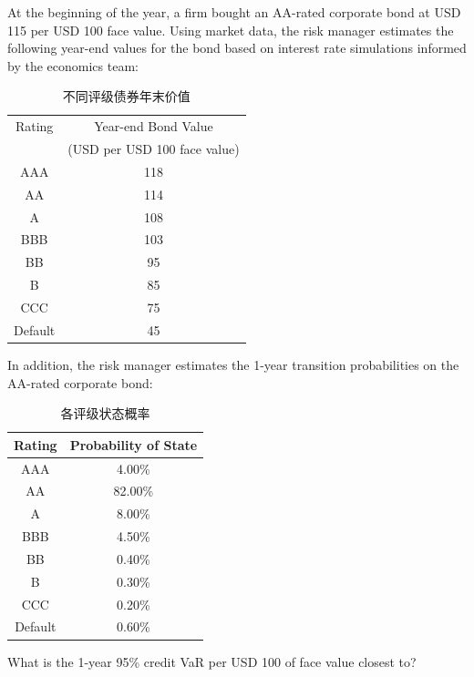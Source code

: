 \documentclass{article}
\newcounter{question} %
\begin{document}
\begin{question}
    At the beginning of the year, a firm bought an AA-rated corporate bond at USD 115 per USD 100 face value. Using market data, the risk manager estimates the following year-end values for the bond based on interest rate simulations informed by the economics team:

    \begin{table}[htbp]
        \centering
        \begin{tabular}{|c|c|}
            \hline
            Rating & Year-end Bond Value \\
            & (USD per USD 100 face value) \\
            \hline
            AAA     & 118 \\
            AA      & 114 \\
            A       & 108 \\
            BBB     & 103 \\
            BB      & 95  \\
            B       & 85  \\
            CCC     & 75  \\
            Default & 45  \\
            \hline
        \end{tabular}
        \caption{不同评级债券年末价值}
    \end{table}

    In addition, the risk manager estimates the 1-year transition probabilities on the AA-rated corporate bond: 
    \begin{table}[htbp]
        \centering
        \begin{tabular}{|c|c|}
            \hline
            Rating & Probability of State \\
            \hline
            AAA     & 4.00\% \\
            AA      & 82.00\% \\
            A       & 8.00\% \\
            BBB     & 4.50\% \\
            BB      & 0.40\% \\
            B       & 0.30\% \\
            CCC     & 0.20\% \\
            Default & 0.60\% \\
            \hline
        \end{tabular}
        \caption{各评级状态概率}
    \end{table}

    What is the 1-year 95\% credit VaR per USD 100 of face value closest to?
\end{question}
\end{document}
